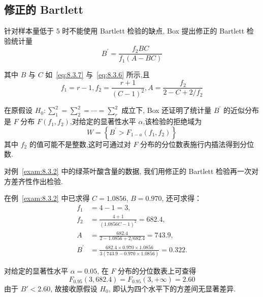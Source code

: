 \subsection{修正的 Bartlett}

针对样本量低于 5 时不能使用 Bartlett 检验的缺点, Box 提出修正的 Bartlett 检验统计量
\begin{equation}\label{eq:8.3.9}
  B^{\prime}=\frac{f_{2} B C}{f_{1}(A-B C)}
\end{equation}

其中 $B$ 与 $C$ 如~\eqref{eq:8.3.7} 与~\eqref{eq:8.3.6} 所示,且
\begin{equation*}
  f_{1}=r-1, f_{2}=\frac{r+1}{(C-1)^{2}}, A=\frac{f_{2}}{2-C+2 / f_{2}}
\end{equation*}

在原假设 $H_0: \sum^2_1 = \sum_2^2 = \cdots = \sum^2_r$ 成立下, Box 还证明了统计量 $B^{\prime}$ 的近似分布是 $F$ 分布 $F(f_1,f_2)$,对给定的显著性水平 $\alpha$,该检验的拒绝域为 
\begin{equation}\label{eq:8.3.10}
  W=\left\{B^{\prime}>F_{1-a}\left(f_{1}, f_{2}\right)\right\}
\end{equation}
其中 $f_2$ 的值可能不是整数,这时可通过对 $F$ 分布的分位数表施行内插法得到分位数.

\begin{example}\label{exam:8.3.3}
  对例~\ref{exam:8.3.2} 中的绿茶叶酸含量的数据, 我们用修正的 Bartlett 检验再一次对方差齐性作出检验.
\end{example}


在例~\ref{exam:8.3.2} 中已求得 $C = 1.0856 $, $B = 0.970$, 还可求得：
\begin{equation*}
  \begin{align}
    f_1 & = 4 - 1 = 3,\\
    f_2 & = \frac{4 + 1}{(1.0856 C -1)^2} = 682.4, \\ 
    A   & = \frac{682.4}{2 - 1.0856 + 2/682.4} = 743.9, \\ 
    B^' & = \frac{682.4 \times 0.970 \times 1.0856}{3(743.9 - 0.970 \times 1.0856)} = 0.322.
  \end{align}
\end{equation*}


对给定的显著性水平 $\alpha = 0.05$, 在 $F$ 分布的分位数表上可查得
\begin{equation}
  F_{0.95}(3,682.4) = F_{0.95}(3, +\infty) = 2.60
\end{equation}
由于 $B' < 2.60$, 故接收原假设 $H_{0}$, 即认为四个水平下的方差间无显著差异.

